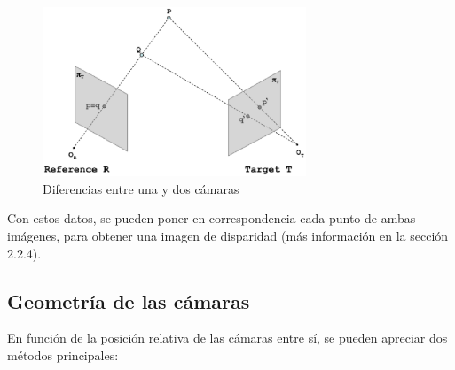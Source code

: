 \begin{figure}[!th]
  \begin{center}
    \includegraphics[width=0.7\textwidth]{images/cap2/VisionEstereo.eps}
    \caption{Diferencias entre una y dos cámaras}
    \label{fig:VisionEstereo}
  \end{center}
\end{figure}

Con estos datos, se pueden poner en correspondencia cada punto de ambas
imágenes, para obtener una imagen de disparidad (más información en la sección 
2.2.4).

\subsection{Geometría de las cámaras}
En función de la posición relativa de las cámaras entre sí, se pueden apreciar
dos métodos principales:

